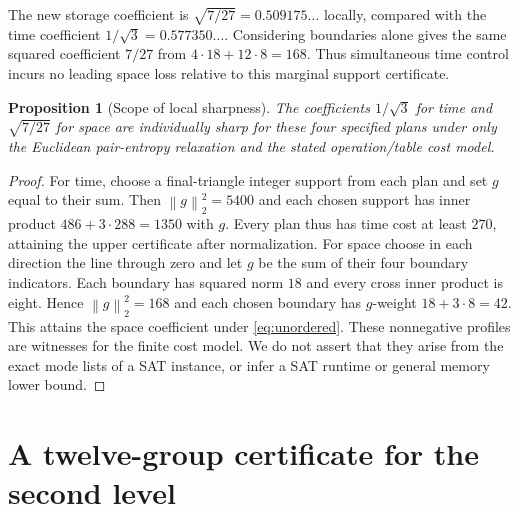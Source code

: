 \documentclass[11pt]{article}
\newtheorem{proposition}[theorem]{Proposition}
\theoremstyle{definition}\newtheorem{definition}[theorem]{Definition}
\theoremstyle{remark}\newtheorem{remark}[theorem]{Remark}
\newcommand{\norm}[1]{\left\lVert#1\right\rVert_2}
\begin{document}
The new storage coefficient is $\sqrt{7/27}=0.509175\ldots$ locally,
compared with the time coefficient $1/\sqrt3=0.577350\ldots$.
Considering boundaries alone gives the same squared coefficient $7/27$
from $4\cdot18+12\cdot8=168$. Thus simultaneous time control incurs no
leading space loss relative to this marginal support certificate.

\begin{proposition}[Scope of local sharpness]
The coefficients $1/\sqrt3$ for time and $\sqrt{7/27}$ for space are
individually sharp for these four specified plans under only the
Euclidean pair-entropy relaxation and the stated operation/table cost model.
\end{proposition}
\begin{proof}
For time, choose a final-triangle integer support from each plan and set
$g$ equal to their sum. Then $\norm g^2=5400$ and each chosen support has
inner product $486+3\cdot288=1350$ with $g$. Every plan thus has time
cost at least $270$, attaining the upper certificate after normalization.
For space choose in each direction the line through zero and let $g$ be
the sum of their four boundary indicators. Each boundary has squared norm
$18$ and every cross inner product is eight. Hence $\norm g^2=168$ and
each chosen boundary has $g$-weight $18+3\cdot8=42$. This attains the
space coefficient under \eqref{eq:unordered}. These nonnegative profiles
are witnesses for the finite cost model. We do not assert that they arise
from the exact mode lists of a SAT instance, or infer a SAT runtime or
general memory lower bound.
\end{proof}

\section{A twelve-group certificate for the second level}
\label{sec:twelve}
\end{document}
